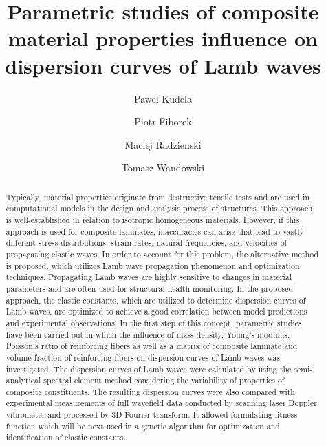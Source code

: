 \documentclass[]{spie}  %
\title{Parametric studies of composite material properties influence on dispersion curves of Lamb waves}
\author[a]{Pawel Kudela}
\author[a]{Piotr Fiborek}
\author[a]{Maciej Radzienski}
\author[a]{Tomasz Wandowski}
\affil[a]{Institute of Fluid-Flow Machinery, Polish Academy of Sciences, Fiszera 14 St, 80-231 Gdansk, Poland}
\begin{document}
 
\maketitle

\begin{abstract}
Typically, material properties originate from destructive tensile tests and are used in computational models in the design and analysis process of structures. 
This approach is well-established in relation to isotropic homogeneous materials. 
However, if this approach is used for composite laminates, inaccuracies can arise that lead to vastly different stress distributions, strain rates, natural frequencies, and velocities of propagating elastic waves. 
In order to account for this problem, the alternative method is proposed, which utilizes Lamb wave propagation phenomenon and optimization techniques. 
Propagating Lamb waves are highly sensitive to changes in material parameters and are often used for structural health monitoring.
In the proposed approach, the elastic constants, which are utilized to determine dispersion curves of Lamb waves, are optimized to achieve a good correlation between model predictions and experimental observations. 
In the first step of this concept, parametric studies have been carried out in which the influence of mass density, Young's modulus, Poisson's ratio of reinforcing fibers as well as a matrix of composite laminate and volume fraction of reinforcing fibers on dispersion curves of Lamb waves was investigated. 
The dispersion curves of Lamb waves were calculated by using the semi-analytical spectral element method considering the variability of properties of composite constituents. 
The resulting dispersion curves were also compared with experimental measurements of full wavefield data conducted by scanning laser Doppler vibrometer and processed by 3D Fourier transform. It allowed formulating fitness function which will be next used in a genetic algorithm for optimization and identification of elastic constants.
\end{abstract}

\end{document}
